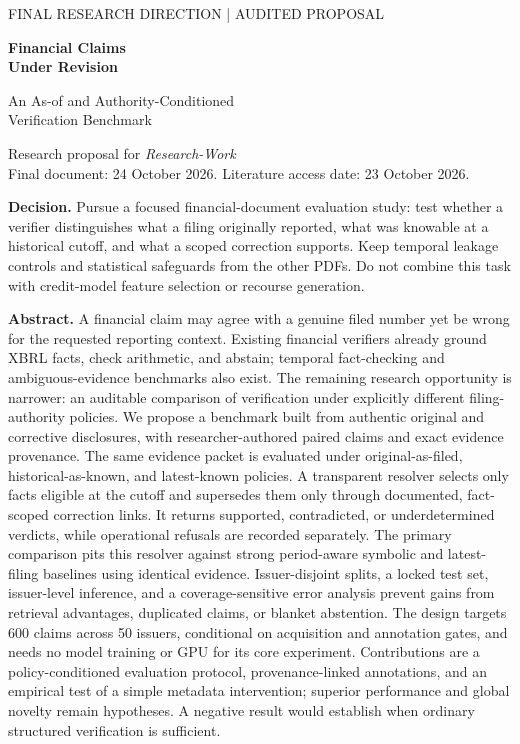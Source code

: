 \documentclass[11pt,a4paper]{article}
\newcommand{\lead}[1]{\textbf{\color{navy}#1}}
\begin{document}
\thispagestyle{empty}
{\sffamily\small\color{teal}FINAL RESEARCH DIRECTION \quad | \quad AUDITED PROPOSAL\par}
\vspace{8mm}
{\Huge\sffamily\bfseries\color{navy}Financial Claims\\[3mm]Under Revision\par}
\vspace{3mm}

{\LARGE\sffamily An As-of and Authority-Conditioned\\ Verification Benchmark\par}
\vspace{5mm}

{\large Research proposal for \textit{Research-Work}}\\
Final document: 24 October 2026. Literature access date: 23 October 2026.

\begin{decisionbox}
\lead{Decision.} Pursue a focused financial-document evaluation study: test whether a verifier distinguishes what a filing originally reported, what was knowable at a historical cutoff, and what a scoped correction supports. Keep temporal leakage controls and statistical safeguards from the other PDFs. Do not combine this task with credit-model feature selection or recourse generation.
\end{decisionbox}

\lead{Abstract.} A financial claim may agree with a genuine filed number yet be wrong for the requested reporting context. Existing financial verifiers already ground XBRL facts, check arithmetic, and abstain; temporal fact-checking and ambiguous-evidence benchmarks also exist. The remaining research opportunity is narrower: an auditable comparison of verification under explicitly different filing-authority policies. We propose a benchmark built from authentic original and corrective disclosures, with researcher-authored paired claims and exact evidence provenance. The same evidence packet is evaluated under original-as-filed, historical-as-known, and latest-known policies. A transparent resolver selects only facts eligible at the cutoff and supersedes them only through documented, fact-scoped correction links. It returns supported, contradicted, or underdetermined verdicts, while operational refusals are recorded separately. The primary comparison pits this resolver against strong period-aware symbolic and latest-filing baselines using identical evidence. Issuer-disjoint splits, a locked test set, issuer-level inference, and a coverage-sensitive error analysis prevent gains from retrieval advantages, duplicated claims, or blanket abstention. The design targets 600 claims across 50 issuers, conditional on acquisition and annotation gates, and needs no model training or GPU for its core experiment. Contributions are a policy-conditioned evaluation protocol, provenance-linked annotations, and an empirical test of a simple metadata intervention; superior performance and global novelty remain hypotheses. A negative result would establish when ordinary structured verification is sufficient.
\end{document}
